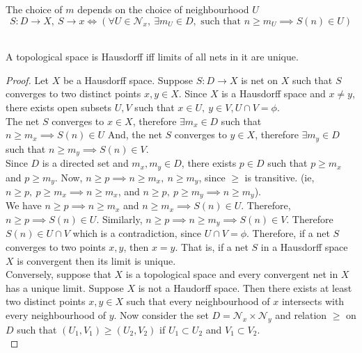 \begin{remark}
\begin{commentary}
	The choice of $m$ depends on the choice of neighbourhood $U$
	$$S: D \to X,\ S \to x \iff \left( \forall U \in \mathcal{N}_x,\ \exists m_U \in D,\text{ such that } n \ge m_U \implies S(n) \in U \right)$$
\end{commentary}
\end{remark}

\begin{theorem}\cite[10.1.4]{joshi}\\
	A topological space is Hausdorff iff limits of all nets in it are unique.
\end{theorem}
\begin{proof}
	Let $X$ be a  Hausdorff space.
	Suppose $S : D \to X$ is net on $X$ such that $S$ converges to two distinct points $x,y \in X$.
	Since $X$ is a Hausdorff space and $x \ne y$, there exists open subsets $U,V$ such that $x \in U,\ y \in V, U \cap V = \phi$.\\

	The net $S$ converges to $x \in X$, therefore $\exists m_x \in D$ such that $n \ge m_x \implies S(n) \in U$
	And, the net $S$ converges to $y \in X$, therefore $\exists m_y \in D$ such that $n \ge m_y \implies S(n) \in V$.\\

	Since $D$ is a directed set and $m_x, m_y \in D$, there exists $p \in D$ such that $p \ge m_x$ and $p \ge m_y$.
	Now, $n \ge p \implies n \ge m_x,\ n \ge m_y$, since $\ge$ is transitive.
	(ie, $n \ge p,\ p \ge m_x \implies n \ge m_x$, and $n \ge p,\ p \ge m_y \implies n \ge m_y$).\\

	We have $n \ge p \implies n \ge m_x$ and $n \ge m_x \implies S(n) \in U$.
	Therefore, $n \ge p \implies S(n) \in U$.
	Similarly, $n \ge p \implies n \ge m_y \implies S(n) \in V$.
	Therefore $S(n) \in U \cap V$ which is a contradiction, since $U \cap V = \phi$.
	Therefore, if a net $S$ converges to two points $x,y$, then $x = y$.
	That is, if a net $S$ in a Hausdorff space $X$ is convergent then its limit is unique.\\

	Conversely, suppose that $X$ is a topological space and every convergent net in $X$ has a unique limit.
	Suppose $X$ is not a Haudorff space.
	Then there exists at least two distinct points $x,y \in X$ such that every neighbourhood of $x$ intersects with every neighbourhood of $y$.
	Now consider the set $D = \mathcal{N}_x \times \mathcal{N}_y$ and relation $\ge$ on $D$ such that $(U_1,V_1) \ge (U_2,V_2)$ if $U_1 \subset U_2$ and $V_1 \subset V_2$.\\



\end{proof}

